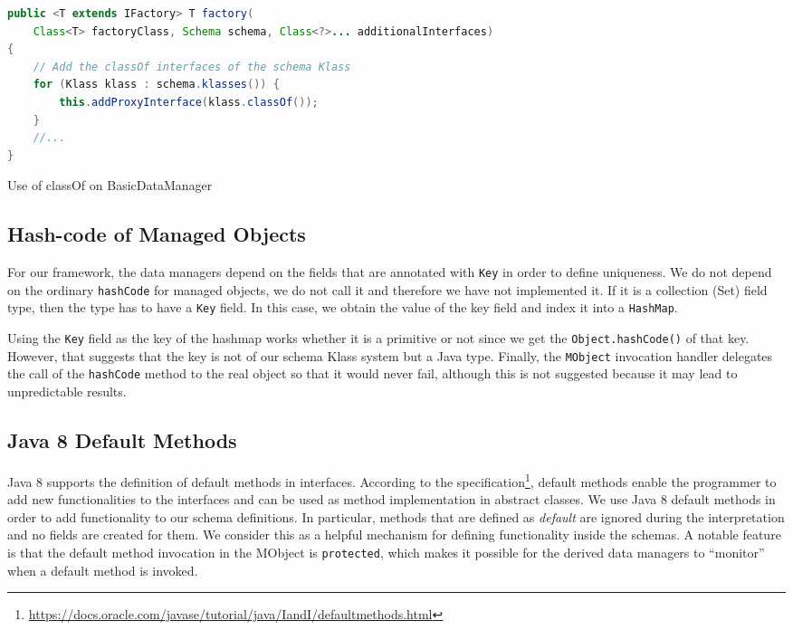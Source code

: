 \begin{sourcecode} [H]
	\begin{lstlisting}[language=Java, escapechar=|]
public <T extends IFactory> T factory(
	Class<T> factoryClass, Schema schema, Class<?>... additionalInterfaces) 
{
	// Add the classOf interfaces of the schema Klass
	for (Klass klass : schema.klasses()) {
		this.addProxyInterface(klass.classOf());
	}
	//...	
}
	\end{lstlisting}
	\caption{Use of classOf on BasicDataManager}
	\label{lst:classOf}
\end{sourcecode}

\subsection{Hash-code of Managed Objects}\label{Hashcode of Managed Objects}
For our framework, the data managers depend on the fields that are annotated with \texttt{Key} in order to define uniqueness.
We do not depend on the ordinary \texttt{hashCode} for managed objects, we do not call it and therefore we have not implemented it.
If it is a collection (Set) field type, then the type has to have a \texttt{Key} field. 
In this case, we obtain the value of the key field and index it into a \texttt{HashMap}. 

Using the \texttt{Key} field as the key of the hashmap works whether it is a primitive or not since we get the \texttt{Object.hashCode()} of that key.
However, that suggests that the key is not of our schema Klass system but a Java type.
Finally, the \texttt{MObject} invocation handler delegates the call of the \texttt{hashCode} method to the real object so that it would never fail, although this is not suggested because it may lead to unpredictable results.

\subsection{Java 8 Default Methods}\label{Java 8 Default Methods}
Java 8 supports the definition of default methods in interfaces.
According to the specification\footnote{\url{https://docs.oracle.com/javase/tutorial/java/IandI/defaultmethods.html}}, default methods enable the programmer to add new functionalities to the interfaces and can be used as method implementation in abstract classes.
We use Java 8 default methods in order to add functionality to our schema definitions. 
In particular, methods that are defined as \textit{default} are ignored during the interpretation and no fields are created for them.
We consider this as a helpful mechanism for defining functionality inside the schemas.
A notable feature is that the default method invocation in the MObject is \texttt{protected}, which makes it possible for the derived data managers to ``monitor'' when a default method is invoked.

